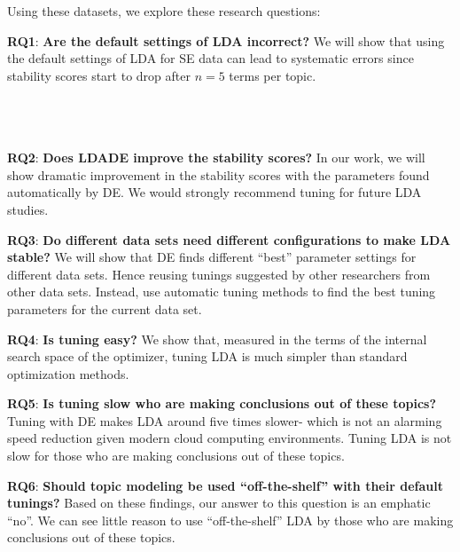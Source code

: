 \documentclass[10pt,conference]{IEEEtran}
\theoremstyle{break}
\begin{document}
\noindent
Using these datasets, we explore these research questions:  
\begin{compactitem}
\item \textbf{RQ1}: \textbf{Are the default settings of LDA incorrect?} We will show that using the default settings of LDA for SE data can lead to systematic errors since stability scores start to drop after $n=5$ terms per topic. \\ \\ \\ \\
    \item \textbf{RQ2}: \textbf{Does LDADE improve the stability scores?} In our work, we will show dramatic improvement in the stability scores with the parameters found automatically by DE. We would strongly recommend tuning for future LDA studies.
    \item \textbf{RQ3}: \textbf{Do different data sets
      need different configurations to make LDA stable?} We will show that DE finds different ``best'' parameter settings for different data sets. Hence reusing tunings  suggested  by  other  researchers  from other  data  sets.  Instead,  use  automatic  tuning  methods  to find the best tuning parameters for the current data set.
    \item \textbf{RQ4}: \textbf{Is tuning easy?} We show that, measured
      in the terms of the internal search space of the optimizer,
      tuning LDA is much simpler than standard optimization methods.
    \item \textbf{RQ5}: \textbf{Is tuning slow who are making conclusions out of these topics?}
      Tuning with DE makes LDA around five times slower- which is not an alarming
      speed reduction given modern cloud computing environments. Tuning LDA is not slow for those who are making conclusions out of these topics.
    \item \textbf{RQ6}: \textbf{Should topic modeling be used “off-the-shelf” with their default tunings?}
      Based on these findings, our answer to this question is an emphatic ``no''. We can see little reason to use “off-the-shelf” LDA by those who are making conclusions out of these topics.
\end{compactitem}
\end{document}
